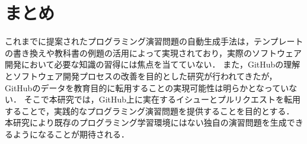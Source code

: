\section{まとめ}
これまでに提案されたプログラミング演習問題の自動生成手法は，テンプレートの書き換えや教科書の例題の活用によって実現されており，実際のソフトウェア開発において必要な知識の習得には焦点を当てていない．
また，GitHubの理解とソフトウェア開発プロセスの改善を目的とした研究が行われてきたが，GitHubのデータを教育目的に転用することの実現可能性は明らかとなっていない．
そこで本研究では，GitHub上に実在するイシューとプルリクエストを転用することで，実践的なプログラミング演習問題を提供することを目的とする．
本研究により既存のプログラミング学習環境にはない独自の演習問題を生成できるようになることが期待される．
